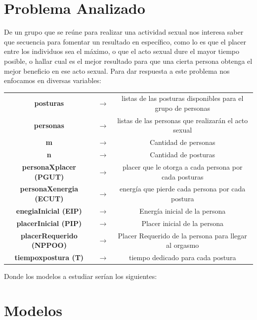 \documentclass{llncs}
\begin{document}
\section{Problema Analizado}
De un grupo que se reúne para realizar una actividad sexual nos interesa saber que secuencia para fomentar un resultado en específico, como lo es que el placer entre los individuos sea el máximo, o que el acto sexual dure el mayor tiempo posible, o hallar cual es el mejor resultado para que una cierta persona obtenga el mejor beneficio en ese acto sexual.
\newline
\newline
Para dar respuesta a este problema nos enfocamos en diversas variables:

\begin{tabular}{ccc}
	\textbf{posturas} & $\rightarrow$ & listas de las posturas disponibles para el grupo de personas\\
	\textbf{personas} & $\rightarrow$ & listas de las personas que realizarán el acto sexual\\
	
	\textbf{m} & $\rightarrow$ & Cantidad de personas\\
	\textbf{n} & $\rightarrow$ & Cantidad de posturas\\
	
	
	\textbf{personaXplacer (PGUT)} & $\rightarrow$ &  placer que le otorga a cada persona por cada posturas \\
	\textbf{personaXenergia (ECUT)} & $\rightarrow$ & energía que pierde cada persona por cada postura\\
	\textbf{enegiaInicial (EIP)} & $\rightarrow$ & Energía inicial de la persona\\
	\textbf{placerInicial (PIP)} & $\rightarrow$ & Placer inicial de la persona\\
	\textbf{placerRequerido (NPPOO)} & $\rightarrow$ & Placer Requerido de la persona para llegar al orgasmo\\
	\textbf{tiempoxpostura (T)} & $\rightarrow$ & tiempo dedicado para cada postura
\end{tabular}
\newline
\newline
\newline
Donde los modelos a estudiar serían los siguientes:
	
\section{Modelos}
\end{document}
